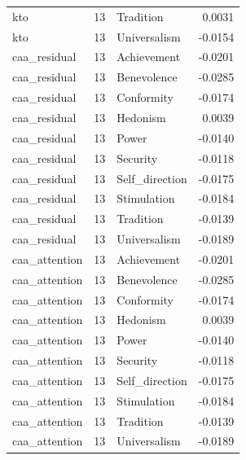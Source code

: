 \begin{tabular}{lrlr}
kto & 13 & Tradition & 0.0031 \\
kto & 13 & Universalism & -0.0154 \\
caa\_residual & 13 & Achievement & -0.0201 \\
caa\_residual & 13 & Benevolence & -0.0285 \\
caa\_residual & 13 & Conformity & -0.0174 \\
caa\_residual & 13 & Hedonism & 0.0039 \\
caa\_residual & 13 & Power & -0.0140 \\
caa\_residual & 13 & Security & -0.0118 \\
caa\_residual & 13 & Self\_direction & -0.0175 \\
caa\_residual & 13 & Stimulation & -0.0184 \\
caa\_residual & 13 & Tradition & -0.0139 \\
caa\_residual & 13 & Universalism & -0.0189 \\
caa\_attention & 13 & Achievement & -0.0201 \\
caa\_attention & 13 & Benevolence & -0.0285 \\
caa\_attention & 13 & Conformity & -0.0174 \\
caa\_attention & 13 & Hedonism & 0.0039 \\
caa\_attention & 13 & Power & -0.0140 \\
caa\_attention & 13 & Security & -0.0118 \\
caa\_attention & 13 & Self\_direction & -0.0175 \\
caa\_attention & 13 & Stimulation & -0.0184 \\
caa\_attention & 13 & Tradition & -0.0139 \\
caa\_attention & 13 & Universalism & -0.0189 \\
\bottomrule
\end{tabular}
